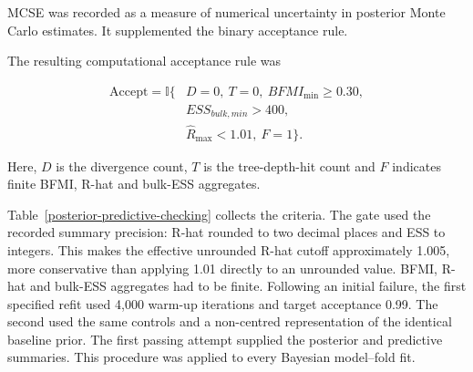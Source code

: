 MCSE was recorded as a measure of numerical uncertainty in posterior Monte Carlo estimates. It supplemented the binary acceptance rule.

The resulting computational acceptance rule was

\begin{equation}
    \begin{aligned}
    \mathrm{Accept} = \mathbb{I}\{ & D = 0,\ T = 0,\ BFMI_{\min} \geq 0.30, \\
     & ESS_{bulk,min} > 400, \\
     & {\widehat{R}}_{\max} < 1.01,\ F = 1\}.
    \end{aligned}
\end{equation}



Here, $D$ is the divergence count, $T$ is the tree-depth-hit count and $F$ indicates finite BFMI, R-hat and bulk-ESS aggregates.

Table~\ref{posterior-predictive-checking} collects the criteria. The gate used the recorded summary precision: R-hat rounded to two decimal places and ESS to integers. This makes the effective unrounded R-hat cutoff approximately 1.005, more conservative than applying 1.01 directly to an unrounded value. BFMI, R-hat and bulk-ESS aggregates had to be finite. Following an initial failure, the first specified refit used 4,000 warm-up iterations and target acceptance 0.99. The second used the same controls and a non-centred representation of the identical baseline prior. The first passing attempt supplied the posterior and predictive summaries. This procedure was applied to every Bayesian model--fold fit.

